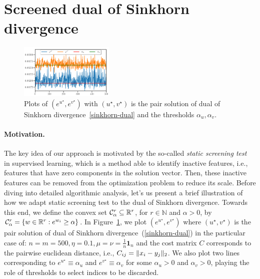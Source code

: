 
\section{Screened dual of Sinkhorn divergence} %
\label{sec:screened_dual_of_sinkhorn_divergence}

\begin{figure}
\vspace{-15pt}
\centering
\includegraphics[width=0.4\textwidth]{./figs/motivations.pdf}
\caption{Plots of $(e^{u^\star}, e^{v^\star})$ with $(u^\star, v^\star)$ is the pair solution of dual of Sinkhorn divergence~\ref{sinkhorn-dual} and the thresholds $\alpha_u, \alpha_v$.}
\label{fig:motivations}
\vspace{-11pt}
\end{figure}

\paragraph{Motivation.} 

The key idea of our approach is motivated by the so-called \emph{static screening test}~\citep{Ghaoui2010SafeFE} in supervised learning, which is a method able to  identify inactive features, i.e., features that have zero components in the solution vector. 
Then, these inactive features can be removed from the optimization problem to reduce its scale.
Before diving into detailed algorithmic analysis, let's us present a brief illustration of how we adapt static screening test to the dual of Sinkhorn divergence.
Towards this end, we define the convex set $\mathcal{C}^r_{\alpha} \subseteq {\mathbb{R}}^r$, for $r\in \mathbb N$ and $\alpha >0$, by $\mathcal{C}^r_{\alpha} = \{w\in {\mathbb{R}}^{r}:  e^{w_i} \geq \alpha\}$.
In Figure~\ref{fig:motivations}, we plot $(e^{u^\star}, e^{v^\star})$ where $(u^\star, v^\star)$ is the pair solution of dual of Sinkhorn divergence~(\ref{sinkhorn-dual}) in the particular case of: $n=m=500, \eta=0.1, \mu = \nu = \frac 1n \mathbf 1_n$ and the cost matrix $C$ corresponds to the pairwise euclidean distance, i.e., $C_{ij} = \|x_i - y_j\|_2$. 
We also plot two lines corresponding to $e^{u^\star} \equiv \alpha_u$ and $e^{v^\star} \equiv \alpha_v$ for some $\alpha_u>0$ and $\alpha_v >0$, playing the role of thresholds to select indices to be discarded. 

